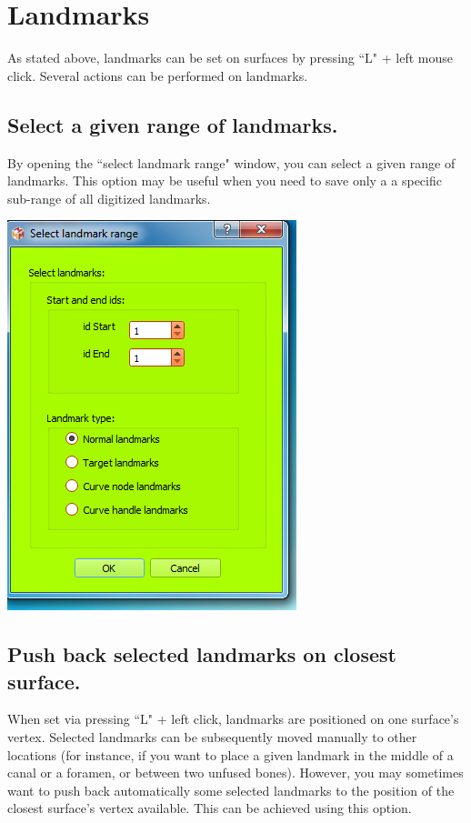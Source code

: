 
\chapter{Landmarks}\label{landmark_chapter}
\minitoc 


As stated above, landmarks can be set on surfaces by pressing ``L" + left mouse click. Several actions
can be performed on landmarks.


\section{Select a given range of landmarks.}
\noindent
\begin{minipage}{0.5\textwidth}
By opening the ``select landmark range" window, you can
select a given range of landmarks. This option may be useful
when you need to save only a a specific sub-range of all
digitized landmarks.
\end{minipage}    
\begin{minipage}{0.5\textwidth}\centering
  \includegraphics[scale=0.5]{images/Edit_selected_landmarks/Select_landmark_range.png}
 \end{minipage} 
\noindent




\section{Push back selected landmarks on closest surface.}
When set via pressing ``L" + left click, landmarks are positioned on one surface's vertex. Selected
landmarks can be subsequently moved manually to other locations (for instance, if you want to place
a given landmark in the middle of a canal or a foramen, or between two unfused bones). However,
you may sometimes want to push back automatically some selected landmarks to the position of the
closest surface's vertex available. This can be achieved using this option.


